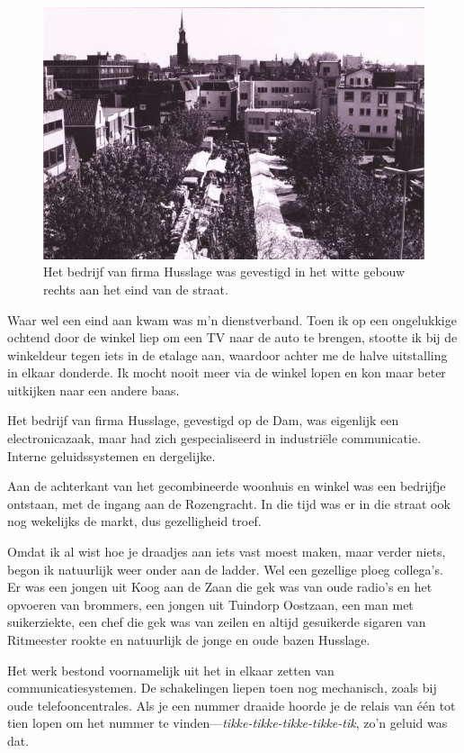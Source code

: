 \documentclass[12pt,twoside, openright]{memoir}
\begin{document}
\begin{figure}
\centering
\includegraphics[width=\textwidth]{img/201husslage}
\caption*{\footnotesize Het bedrijf van firma Husslage was gevestigd in het witte gebouw rechts aan het eind van de straat.}
\end{figure}

Waar wel een eind aan kwam was m’n dienstverband. Toen ik op een ongelukkige ochtend door de winkel liep om een TV naar de auto te brengen, stootte ik bij de winkeldeur tegen iets in de etalage aan, waardoor achter me de halve uitstalling in elkaar donderde. Ik mocht nooit meer via de winkel lopen en kon maar beter uitkijken naar een andere baas.

Het bedrijf van firma Husslage, gevestigd op de Dam, was eigenlijk een electronicazaak, maar had zich gespecialiseerd in industriële communicatie. Interne geluidssystemen en dergelijke. 

Aan de achterkant van het gecombineerde woonhuis en winkel was een bedrijfje ontstaan, met de ingang aan de Rozengracht. In die tijd was er in die straat ook nog wekelijks de markt, dus gezelligheid troef. 

Omdat ik al wist hoe je draadjes aan iets vast moest maken, maar verder niets, begon ik natuurlijk weer onder aan de ladder. Wel een gezellige ploeg collega’s. Er was een jongen uit Koog aan de Zaan die gek was van oude radio’s en het opvoeren van brommers, een jongen uit Tuindorp Oostzaan, een man met suikerziekte, een chef die gek was van zeilen en altijd gesuikerde sigaren van Ritmeester rookte en natuurlijk de jonge en oude bazen Husslage. 

Het werk bestond voornamelijk uit het in elkaar zetten van communicatiesystemen. De schakelingen liepen toen nog mechanisch, zoals bij oude telefooncentrales. Als je een nummer draaide hoorde je de relais van één tot tien lopen om het nummer te vinden---\emph{tikke-tikke-tikke-tikke-tik}, zo’n geluid was dat.  
\end{document}
